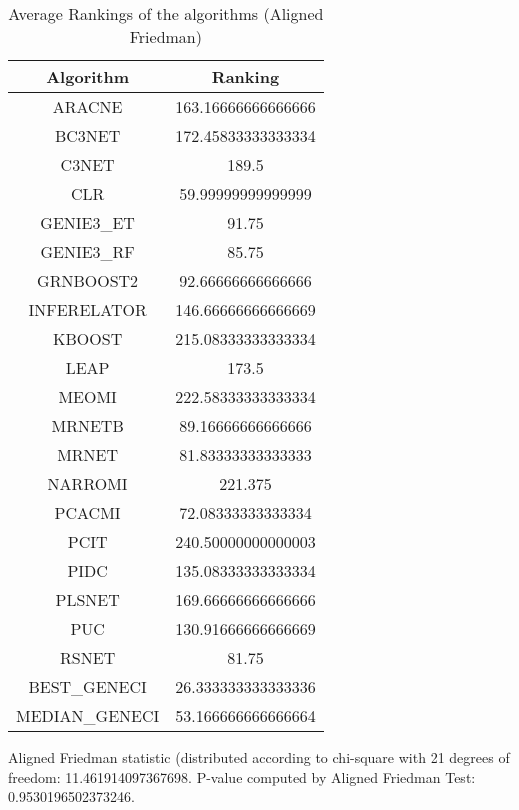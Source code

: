 \documentclass[a4paper,10pt]{article}
\begin{document}
\begin{landscape}
\newpage

\begin{table}[!htp]
\centering
\caption{Average Rankings of the algorithms (Aligned Friedman)
}\begin{tabular}{c|c}
Algorithm&Ranking\\
\hline
ARACNE&163.16666666666666\\
BC3NET&172.45833333333334\\
C3NET&189.5\\
CLR&59.99999999999999\\
GENIE3_ET&91.75\\
GENIE3_RF&85.75\\
GRNBOOST2&92.66666666666666\\
INFERELATOR&146.66666666666669\\
KBOOST&215.08333333333334\\
LEAP&173.5\\
MEOMI&222.58333333333334\\
MRNETB&89.16666666666666\\
MRNET&81.83333333333333\\
NARROMI&221.375\\
PCACMI&72.08333333333334\\
PCIT&240.50000000000003\\
PIDC&135.08333333333334\\
PLSNET&169.66666666666666\\
PUC&130.91666666666669\\
RSNET&81.75\\
BEST_GENECI&26.333333333333336\\
MEDIAN_GENECI&53.166666666666664\\
\end{tabular}
\end{table}


Aligned Friedman statistic (distributed according to chi-square with 21 degrees of freedom: 11.461914097367698. 
P-value computed by Aligned Friedman Test: 0.9530196502373246.\newline


\newpage


\end{landscape}
\end{document}
